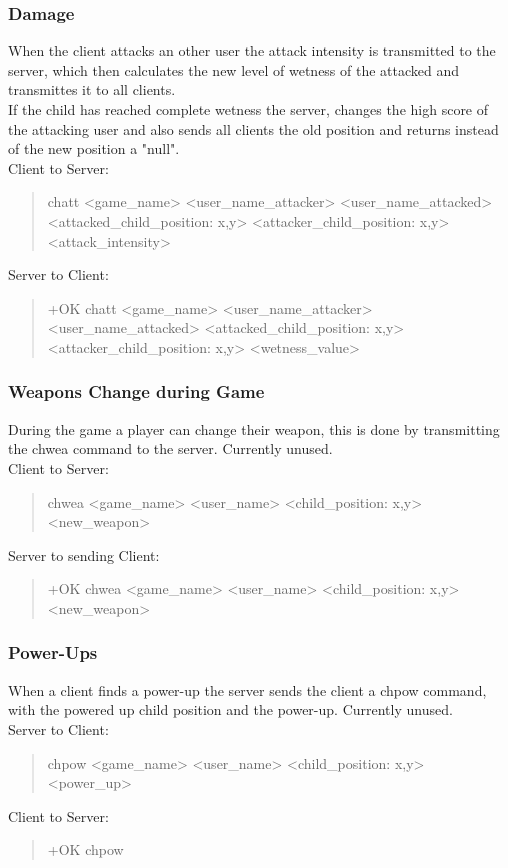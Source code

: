 \documentclass[a4paper,11pt]{article}
\begin{document}
\subsubsection{Damage}
When the client attacks an other user the attack intensity is transmitted to the server, which then calculates the new level of wetness of the attacked and transmittes it to all clients.\\
If the child has reached complete wetness the server, changes the high score of the attacking user and also sends all clients the old position and returns instead of the new position a "null".\\
Client to Server:
\begin{quote}
  chatt <game\_name> <user\_name\_attacker> <user\_name\_attacked> <attacked\_child\_position: x,y> <attacker\_child\_position: x,y> <attack\_intensity>
\end{quote}
\noindent
Server to Client:
\begin{quote}
  +OK chatt <game\_name> <user\_name\_attacker> <user\_name\_attacked> <attacked\_child\_position: x,y> <attacker\_child\_position: x,y> <wetness\_value>
\end{quote}


\subsubsection{Weapons Change during Game}
During the game a player can change their weapon, this is done by transmitting the chwea command to the server. Currently unused.\\
Client to Server:
\begin{quote}
  chwea <game\_name> <user\_name> <child\_position: x,y> <new\_weapon>
\end{quote}
\noindent
Server to sending Client:
\begin{quote}
  +OK chwea <game\_name> <user\_name> <child\_position: x,y> <new\_weapon>
\end{quote}

\subsubsection{Power-Ups}
When a client finds a power-up the server sends the client a chpow command, with the powered up child position and the power-up. Currently unused.\\
Server to Client:
\begin{quote}
  chpow <game\_name> <user\_name> <child\_position: x,y> <power\_up>
\end{quote}
\noindent
Client to Server:
\begin{quote}
  +OK chpow
\end{quote}
\end{document}
